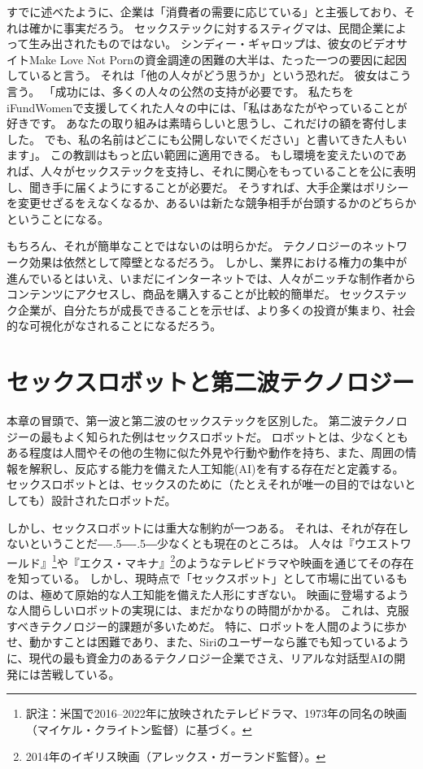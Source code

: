 \documentclass[paper=a4,book,openany]{jlreq}
\def\DDASH{―\kern-.5\zw―\kern-.5\zw―} %
\begin{document}
すでに述べたように、企業は「消費者の需要に応じている」と主張しており、それは確かに事実だろう。
セックステックに対するスティグマは、民間企業によって生み出されたものではない。
シンディー・ギャロップは、彼女のビデオサイトMake Love Not Pornの資金調達の困難の大半は、たった一つの要因に起因していると言う。
それは「他の人々がどう思うか」という恐れだ。
彼女はこう言う。
「成功には、多くの人々の公然の支持が必要です。
私たちをiFundWomenで支援してくれた人々の中には、「私はあなたがやっていることが好きです。
あなたの取り組みは素晴らしいと思うし、これだけの額を寄付しました。
でも、私の名前はどこにも公開しないでください」と書いてきた人もいます」\citep{manning17:_sextec_revol_will_not_be_crowd}。
この教訓はもっと広い範囲に適用できる。
もし環境を変えたいのであれば、人々がセックステックを支持し、それに関心をもっていることを公に表明し、聞き手に届くようにすることが必要だ。
そうすれば、大手企業はポリシーを変更せざるをえなくなるか、あるいは新たな競争相手が台頭するかのどちらかということになる。

もちろん、それが簡単なことではないのは明らかだ。
テクノロジーのネットワーク効果は依然として障壁となるだろう。
しかし、業界における権力の集中が進んでいるとはいえ、いまだにインターネットでは、人々がニッチな制作者からコンテンツにアクセスし、商品を購入することが比較的簡単だ。
セックステック企業が、自分たちが成長できることを示せば、より多くの投資が集まり、社会的な可視化がなされることになるだろう。

\section{セックスロボットと第二波テクノロジー}

本章の冒頭で、第一波と第二波のセックステックを区別した。
第二波テクノロジーの最もよく知られた例はセックスロボットだ。
ロボットとは、少なくともある程度は人間やその他の生物に似た外見や行動や動作を持ち、また、周囲の情報を解釈し、反応する能力を備えた人工知能(AI)を有する存在だと定義する\citep{danaher17:_shoul_we_be_think_sex_robot}。
セックスロボットとは、セックスのために（たとえそれが唯一の目的ではないとしても）設計されたロボットだ。

しかし、セックスロボットには重大な制約が一つある。
それは、それが存在しないということだ{\DDASH}少なくとも現在のところは。
人々は『ウエストワールド』\footnote{訳注：米国で2016--2022年に放映されたテレビドラマ、1973年の同名の映画（マイケル・クライトン監督）に基づく。}や『エクス・マキナ』\footnote{2014年のイギリス映画（アレックス・ガーランド監督）。}のようなテレビドラマや映画を通じてその存在を知っている。
しかし、現時点で「セックスボット」として市場に出ているものは、極めて原始的な人工知能を備えた人形にすぎない。
映画に登場するような人間らしいロボットの実現には、まだかなりの時間がかかる。
これは、克服すべきテクノロジー的課題が多いためだ。
特に、ロボットを人間のように歩かせ、動かすことは困難であり、また、Siriのユーザーなら誰でも知っているように、現代の最も資金力のあるテクノロジー企業でさえ、リアルな対話型AIの開発には苦戦している。
\end{document}
